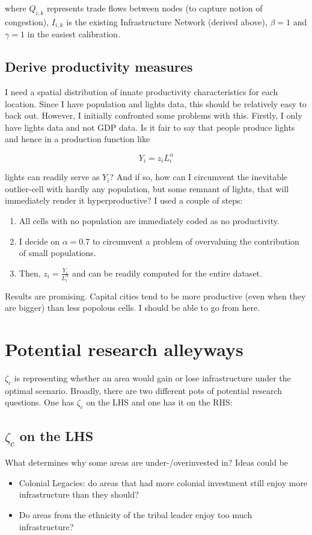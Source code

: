 \documentclass[11pt, oneside]{article}   	%
\begin{document}
where $Q_{i,k}$ represents trade flows between nodes (to capture notion of congestion), $I_{i,k}$ is the existing Infrastructure Network (derived above), $\beta = 1$ and $\gamma = 1$ in the easiest calibration.

\subsection{Derive productivity measures}

I need a spatial distribution of innate productivity characteristics for each location. Since I have population and lights data, this should be relatively easy to back out. However, I initially confronted some problems with this. Firstly, I only have lights data and not GDP data. Is it fair to say that people produce lights and hence in a production function like

\begin{equation}
  Y_{i} = z_{i}L_{i}^{\alpha}
\end{equation}

lights can readily serve as $Y_{i}$? And if so, how can I circumvent the inevitable outlier-cell with hardly any population, but some remnant of lights, that will immediately render it hyperproductive? I used a couple of steps:

\begin{enumerate}
  \item All cells with no population are immediately coded as no productivity.
  \item I decide on $\alpha = 0.7$ to circumvent a problem of overvaluing the contribution of small populations.
  \item Then, $z_{i} = \frac{Y_{i}}{L_{i}^{\alpha}}$ and can be readily computed for the entire dataset.
\end{enumerate}

Results are promising. Capital cities tend to be more productive (even when they are bigger) than less popolous cells. I should be able to go from here.

\section{Potential research alleyways}
$\zeta_{c}$ is representing whether an area would gain or lose infrastructure under the optimal scenario. Broadly, there are two different pots of potential research questions. One has $\zeta_{c}$ on the LHS and one has it on the RHS:

\subsection{$\zeta_{c}$ on the LHS}
What determines why some areas are under-/overinvested in? Ideas could be
\begin{itemize}
  \item Colonial Legacies: do areas that had more colonial investment still enjoy more infrastructure than they should?
  \item Do areas from the ethnicity of the tribal leader enjoy too much infrastructure?
\end{itemize}
\end{document}

